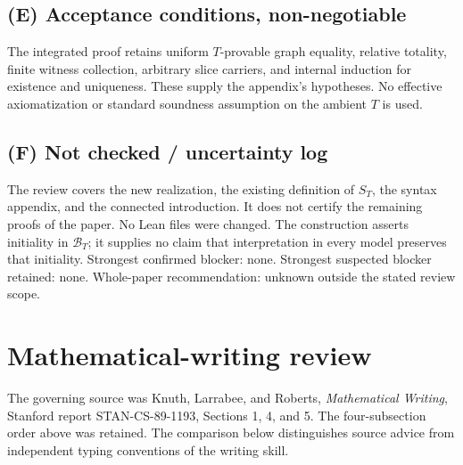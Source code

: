 \documentclass[11pt]{article}
\newcommand{\BT}{\mathcal B_T}
\begin{document}
\subsection*{(E) Acceptance conditions, non-negotiable}
The integrated proof retains uniform $T$-provable graph equality,
relative totality, finite witness collection, arbitrary slice carriers,
and internal induction for existence and uniqueness. These supply the
appendix's hypotheses. No effective axiomatization or standard soundness
assumption on the ambient $T$ is used.

\subsection*{(F) Not checked / uncertainty log}
The review covers the new realization, the existing definition of $S_T$,
the syntax appendix, and the connected introduction. It does not certify
the remaining proofs of the paper. No Lean files were changed. The
construction asserts initiality in $\BT$; it supplies no claim that
interpretation in every model preserves that initiality. Strongest
confirmed blocker: none. Strongest suspected blocker retained: none.
Whole-paper recommendation: unknown outside the stated review scope.

\section*{Mathematical-writing review}
The governing source was Knuth, Larrabee, and Roberts,
\emph{Mathematical Writing}, Stanford report STAN-CS-89-1193,
Sections 1, 4, and 5. The four-subsection order above was retained.
The comparison below distinguishes source advice from independent
typing conventions of the writing skill.
\end{document}
